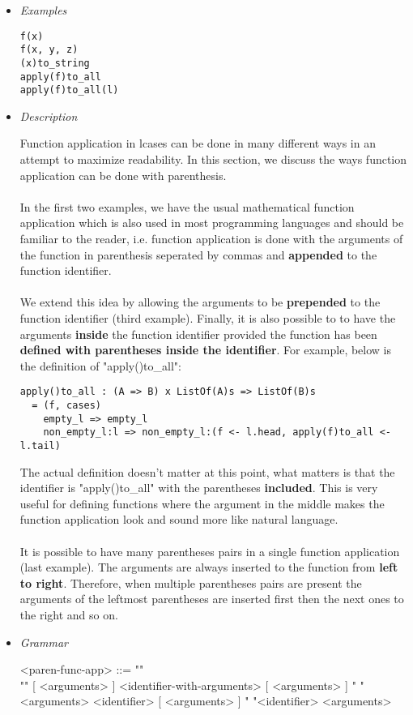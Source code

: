 \documentclass{article}
\begin{document}
\begin{itemize}
\item \textit{Examples}

\begin{verbatim}
f(x)
f(x, y, z)
(x)to_string
apply(f)to_all
apply(f)to_all(l)
\end{verbatim}

\item \textit{Description}

Function application in lcases can be done in many different ways in an attempt to 
maximize readability. In this section, we discuss the ways function application can
be done with parenthesis.
\\\\
In the first two examples, we have the usual mathematical
function application which is also used in most programming languages and
should be familiar to the reader, i.e. function application is done with the 
arguments of the function in parenthesis seperated by commas and \textbf{appended}
to the function identifier.
\\\\
We extend this idea by allowing the arguments to be \textbf{prepended} to the
function identifier (third example). Finally, it is also possible to to have
the arguments \textbf{inside} the function identifier provided the function has
been \textbf{defined with parentheses inside the identifier}. For example,
below is the definition of "apply()to\_all":

\begin{verbatim}
apply()to_all : (A => B) x ListOf(A)s => ListOf(B)s
  = (f, cases)
    empty_l => empty_l
    non_empty_l:l => non_empty_l:(f <- l.head, apply(f)to_all <- l.tail)
\end{verbatim}
The actual definition doesn't matter at this point, what matters is that the 
identifier is "apply()to\_all" with the parentheses \textbf{included}. This is very
useful for defining functions where the argument in the middle makes the function
application look and sound more like natural language.
\\\\
It is possible to have many parentheses pairs in a single function application
(last example). The arguments are always inserted to the function from
\textbf{left to right}.  Therefore, when multiple parentheses pairs are present
the arguments of the leftmost parentheses are inserted first then the next ones
to the right and so on.

\item \textit{Grammar}
\begin{grammar}
<paren-func-app> ::= ""\\""
[ <arguments> ] <identifier-with-arguments> [ <arguments> ]
\alt " "<arguments> <identifier> [ <arguments> ]
\alt " "<identifier> <arguments>


\end{grammar}
\end{itemize}
\end{document}
